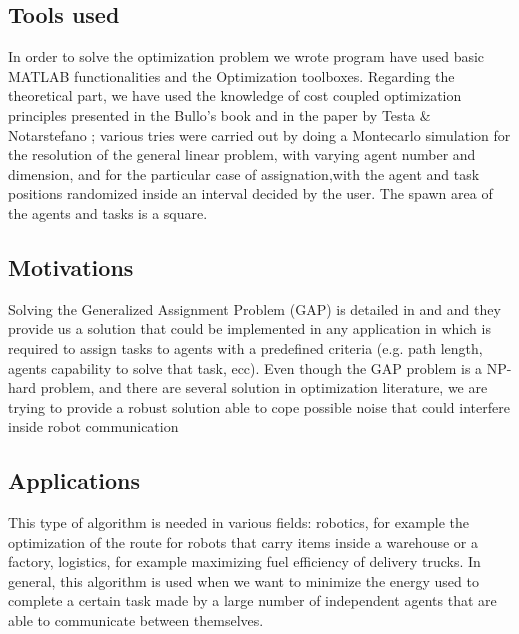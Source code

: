 \documentclass{article}
\begin{document}
\subsection{Tools used}

In order to solve the optimization problem we wrote program \citep{Omni} have used basic MATLAB functionalities and the Optimization toolboxes. Regarding the theoretical part, we have used the knowledge of cost coupled optimization principles presented in the Bullo's book \citep{Bullo} and in the paper by Testa & Notarstefano \citep{Testa} ; various tries were carried out by doing a Montecarlo simulation for the resolution of the general linear problem, with varying agent number and dimension, and for the particular case of assignation,with the agent and task positions randomized inside an interval decided by the user. The spawn area of the agents and tasks is a square. 


\subsection{Motivations}
Solving the Generalized Assignment Problem (GAP) is detailed in \citep{Testa} and \citep{Nostro}  and they provide us a solution that could be implemented in any application in which is required to assign tasks to agents with a predefined criteria (e.g. path length, agents capability to solve that task, ecc).
Even though the GAP problem is a NP-hard problem, and there are several solution in optimization literature, we are trying to provide a robust solution able to cope possible noise that could interfere inside robot communication


\subsection{Applications}
This type of algorithm is needed in various fields: robotics, for example the optimization of the route for robots that carry items inside a warehouse or a factory, logistics, for example maximizing fuel efficiency of delivery trucks. In general, this algorithm is used when we want to minimize the energy used to complete a certain task made by a large number of independent agents that are able to communicate between themselves.  
\end{document}
